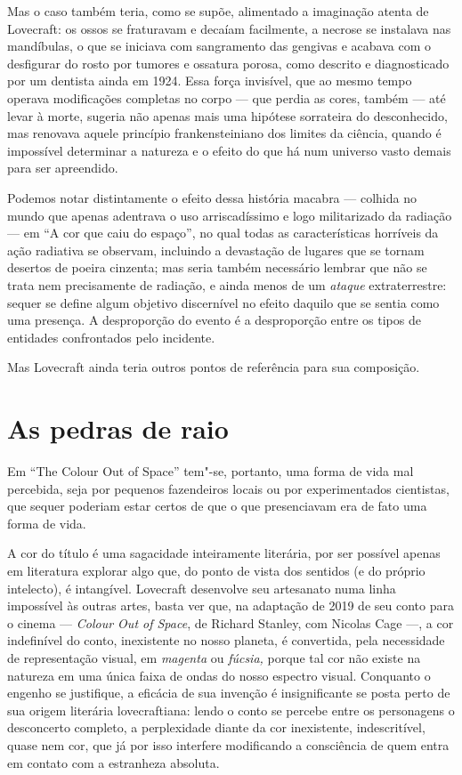 Mas o caso também teria, como se supõe, alimentado a imaginação atenta
de Lovecraft: os ossos se fraturavam e decaíam facilmente, a necrose se
instalava nas mandíbulas, o que se iniciava com sangramento das gengivas
e acabava com o desfigurar do rosto por tumores e ossatura porosa, como
descrito e diagnosticado por um dentista ainda em 1924. Essa força
invisível, que ao mesmo tempo operava modificações completas no corpo
--- que perdia as cores, também --- até levar à morte, sugeria não
apenas mais uma hipótese sorrateira do desconhecido, mas renovava aquele
princípio frankensteiniano dos limites da ciência, quando é impossível
determinar a natureza e o efeito do que há num universo vasto demais
para ser apreendido.

Podemos notar distintamente o efeito dessa história macabra --- colhida
no mundo que apenas adentrava o uso arriscadíssimo e logo militarizado
da radiação --- em ``A cor que caiu do espaço'', no qual todas as
características horríveis da ação radiativa se observam, incluindo a
devastação de lugares que se tornam desertos de poeira cinzenta; mas
seria também necessário lembrar que não se trata nem precisamente de
radiação, e ainda menos de um \emph{ataque} extraterrestre: sequer se
define algum objetivo discernível no efeito daquilo que se sentia como
uma presença. A desproporção do evento é a desproporção entre os tipos
de entidades confrontados pelo incidente.

Mas Lovecraft ainda teria outros pontos de referência para sua
composição.

\section*{As pedras de raio}

Em ``The Colour Out of Space'' tem"-se, portanto, uma forma de vida mal
percebida, seja por pequenos fazendeiros locais ou por experimentados
cientistas, que sequer poderiam estar certos de que o que presenciavam
era de fato uma forma de vida.

A cor do título é uma sagacidade inteiramente literária, por ser
possível apenas em literatura explorar algo que, do ponto de vista dos
sentidos (e do próprio intelecto), é intangível. Lovecraft desenvolve
seu artesanato numa linha impossível às outras artes, basta ver que, na
adaptação de 2019 de seu conto para o cinema --- \emph{Colour Out of
Space}, de Richard Stanley, com Nicolas Cage ---, a cor indefinível do
conto, inexistente no nosso planeta, é convertida, pela necessidade de
representação visual, em \emph{magenta} ou \emph{fúcsia,} porque tal cor
não existe na natureza em uma única faixa de ondas do nosso espectro
visual. Conquanto o engenho se justifique, a eficácia de sua invenção é
insignificante se posta perto de sua origem literária lovecraftiana:
lendo o conto se percebe entre os personagens o desconcerto completo, a
perplexidade diante da cor inexistente, indescritível, quase nem cor,
que já por isso interfere modificando a consciência de quem entra em
contato com a estranheza absoluta.

